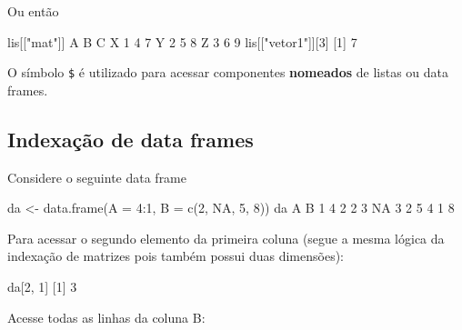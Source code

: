 \documentclass[
  10pt,
  a4paper]{book}
\newenvironment{Shaded}{\begin{snugshade}}{\end{snugshade}}
\newcommand{\AttributeTok}[1]{\textcolor[rgb]{0.77,0.63,0.00}{#1}}
\newcommand{\ConstantTok}[1]{\textcolor[rgb]{0.00,0.00,0.00}{#1}}
\newcommand{\DecValTok}[1]{\textcolor[rgb]{0.00,0.00,0.81}{#1}}
\newcommand{\FunctionTok}[1]{\textcolor[rgb]{0.00,0.00,0.00}{#1}}
\newcommand{\NormalTok}[1]{#1}
\newcommand{\OtherTok}[1]{\textcolor[rgb]{0.56,0.35,0.01}{#1}}
\newcommand{\SpecialCharTok}[1]{\textcolor[rgb]{0.00,0.00,0.00}{#1}}
\newcommand{\StringTok}[1]{\textcolor[rgb]{0.31,0.60,0.02}{#1}}
\begin{document}
Ou então

\begin{Shaded}
\begin{Highlighting}[]
\NormalTok{lis[[}\StringTok{"mat"}\NormalTok{]]}
\NormalTok{  A B C}
\NormalTok{X }\DecValTok{1} \DecValTok{4} \DecValTok{7}
\NormalTok{Y }\DecValTok{2} \DecValTok{5} \DecValTok{8}
\NormalTok{Z }\DecValTok{3} \DecValTok{6} \DecValTok{9}
\NormalTok{lis[[}\StringTok{"vetor1"}\NormalTok{]][}\DecValTok{3}\NormalTok{]}
\NormalTok{[}\DecValTok{1}\NormalTok{] }\DecValTok{7}
\end{Highlighting}
\end{Shaded}

O símbolo \texttt{\$} é utilizado para acessar componentes \textbf{nomeados} de
listas ou data frames.

\hypertarget{indexauxe7uxe3o-de-data-frames}{%
\subsection{Indexação de data frames}\label{indexauxe7uxe3o-de-data-frames}}

Considere o seguinte data frame

\begin{Shaded}
\begin{Highlighting}[]
\NormalTok{da }\OtherTok{\textless{}{-}} \FunctionTok{data.frame}\NormalTok{(}\AttributeTok{A =} \DecValTok{4}\SpecialCharTok{:}\DecValTok{1}\NormalTok{, }\AttributeTok{B =} \FunctionTok{c}\NormalTok{(}\DecValTok{2}\NormalTok{, }\ConstantTok{NA}\NormalTok{, }\DecValTok{5}\NormalTok{, }\DecValTok{8}\NormalTok{))}
\NormalTok{da}
\NormalTok{  A  B}
\DecValTok{1} \DecValTok{4}  \DecValTok{2}
\DecValTok{2} \DecValTok{3} \ConstantTok{NA}
\DecValTok{3} \DecValTok{2}  \DecValTok{5}
\DecValTok{4} \DecValTok{1}  \DecValTok{8}
\end{Highlighting}
\end{Shaded}

Para acessar o segundo elemento da primeira coluna (segue a mesma lógica
da indexação de matrizes pois também possui duas dimensões):

\begin{Shaded}
\begin{Highlighting}[]
\NormalTok{da[}\DecValTok{2}\NormalTok{, }\DecValTok{1}\NormalTok{]}
\NormalTok{[}\DecValTok{1}\NormalTok{] }\DecValTok{3}
\end{Highlighting}
\end{Shaded}

Acesse todas as linhas da coluna B:
\end{document}

